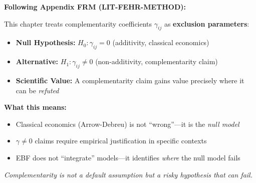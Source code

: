 \begin{tcolorbox}[
    colback=red!5!white,
    colframe=red!75!black,
    title={\textbf{Methodological Note: The Exclusion Principle}},
    fonttitle=\bfseries
]
\textbf{Following Appendix FRM (LIT-FEHR-METHOD):}

This chapter treats complementarity coefficients $\gamma_{ij}$ as \textbf{exclusion parameters}:
\begin{itemize}[nosep]
    \item \textbf{Null Hypothesis:} $H_0: \gamma_{ij} = 0$ (additivity, classical economics)
    \item \textbf{Alternative:} $H_1: \gamma_{ij} \neq 0$ (non-additivity, complementarity claim)
    \item \textbf{Scientific Value:} A complementarity claim gains value precisely where it can be \textit{refuted}
\end{itemize}

\medskip
\textbf{What this means:}
\begin{itemize}[nosep]
    \item Classical economics (Arrow-Debreu) is not ``wrong''---it is the \textit{null model}
    \item $\gamma \neq 0$ claims require empirical justification in specific contexts
    \item EBF does not ``integrate'' models---it identifies \textit{where} the null model fails
\end{itemize}

\textit{Complementarity is not a default assumption but a risky hypothesis that can fail.}
\end{tcolorbox}

